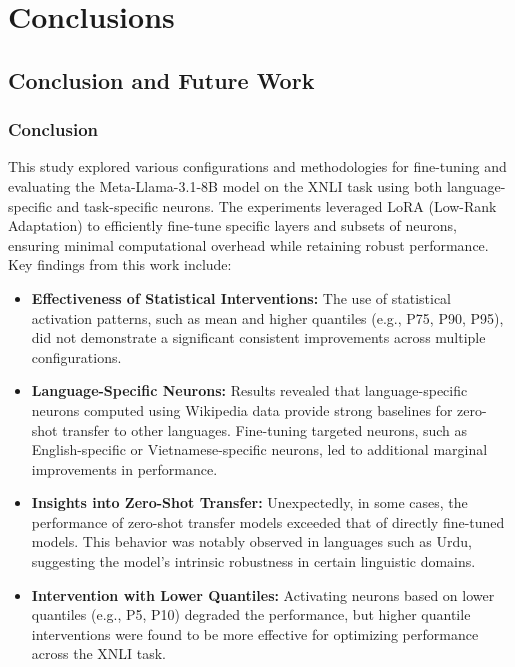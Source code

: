 
\chapter{Conclusions}\singlespacing %

\label{Chapter6} %




\section{Conclusion and Future Work}

\subsection{Conclusion}
This study explored various configurations and methodologies for fine-tuning and evaluating the Meta-Llama-3.1-8B model on the XNLI task using both language-specific and task-specific neurons. The experiments leveraged LoRA (Low-Rank Adaptation) to efficiently fine-tune specific layers and subsets of neurons, ensuring minimal computational overhead while retaining robust performance. Key findings from this work include:

\begin{itemize}
	\item \textbf{Effectiveness of Statistical Interventions:} The use of statistical activation patterns, such as mean and higher quantiles (e.g., P75, P90, P95), did not demonstrate a significant consistent improvements across multiple configurations.
	
	\item \textbf{Language-Specific Neurons:} Results revealed that language-specific neurons computed using Wikipedia data provide strong baselines for zero-shot transfer to other languages. Fine-tuning targeted neurons, such as English-specific or Vietnamese-specific neurons, led to additional marginal improvements in performance.
	
	\item \textbf{Insights into Zero-Shot Transfer:} Unexpectedly, in some cases, the performance of zero-shot transfer models exceeded that of directly fine-tuned models. This behavior was notably observed in languages such as Urdu, suggesting the model's intrinsic robustness in certain linguistic domains.
	
	\item \textbf{Intervention with Lower Quantiles:} Activating neurons based on lower quantiles (e.g., P5, P10) degraded the performance, but higher quantile interventions were found to be more effective for optimizing performance across the XNLI task.
\end{itemize}

